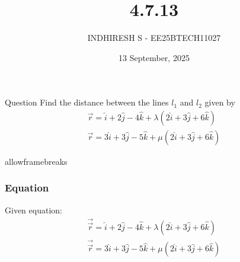 \documentclass{beamer}
\title %
{4.7.13}
\date{13 September, 2025}
\author %
{INDHIRESH S - EE25BTECH11027}
\begin{document}
\frame{\titlepage}
\begin{frame}{Question}
 Find the distance between the lines $l_1$ and $l_2$ given by
\begin{align*}
    \overrightarrow{r}=\hat{i}+2\hat{j}-4\hat{k}+\lambda(2\hat{i}+3\hat{j}+6\hat{k})\\\overrightarrow{r}=3\hat{i}+3\hat{j}-5\hat{k}+\mu(2\hat{i}+3\hat{j}+6\hat{k})
\end{align*}
\end{frame}
\begin{frame}{allowframebreaks}
\frametitle{Equation}

    \centering
    
    \label{tab:parameters}
Given equation:
\begin{align}
   \overrightarrow{\Vec{r}}=\hat{i}+2\hat{j}-4\hat{k}+\lambda(2\hat{i}+3\hat{j}+6\hat{k}) \\
\overrightarrow{\Vec{r}}=3\hat{i}+3\hat{j}-5\hat{k}+\mu(2\hat{i}+3\hat{j}+6\hat{k})\\
\end{align}

   
\end{frame}
\end{document}
